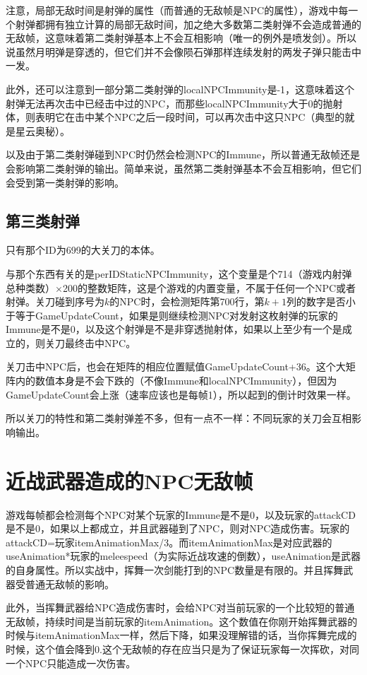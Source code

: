 注意，局部无敌时间是射弹的属性（而普通的无敌帧是NPC的属性），游戏中每一个射弹都拥有独立计算的局部无敌时间，加之绝大多数第二类射弹不会造成普通的无敌帧，这意味着第二类射弹基本上不会互相影响（唯一的例外是喷发剑）。所以说虽然月明弹是穿透的，但它们并不会像陨石弹那样连续发射的两发子弹只能击中一发。

此外，还可以注意到一部分第二类射弹的localNPCImmunity是-1，这意味着这个射弹无法再次击中已经击中过的NPC，而那些localNPCImmunity大于0的抛射体，则表明它在击中某个NPC之后一段时间，可以再次击中这只NPC（典型的就是星云奥秘）。

以及由于第二类射弹碰到NPC时仍然会检测NPC的Immune，所以普通无敌帧还是会影响第二类射弹的输出。简单来说，虽然第二类射弹基本不会互相影响，但它们会受到第一类射弹的影响。

\subsection{第三类射弹}
只有那个ID为699的大关刀的本体。

与那个东西有关的是perIDStaticNPCImmunity，这个变量是个714（游戏内射弹总种类数）$\times$200的整数矩阵，这是个游戏的内置变量，不属于任何一个NPC或者射弹。关刀碰到序号为$k$的NPC时，会检测矩阵第700行，第$k+1$列的数字是否小于等于GameUpdateCount，如果是则继续检测NPC对发射这枚射弹的玩家的Immune是不是0，以及这个射弹是不是非穿透抛射体，如果以上至少有一个是成立的，则关刀最终击中NPC。

关刀击中NPC后，也会在矩阵的相应位置赋值GameUpdateCount+36。这个大矩阵内的数值本身是不会下跌的（不像Immune和localNPCImmunity），但因为GameUpdateCount会上涨（速率应该也是每帧1），所以起到的倒计时效果一样。

所以关刀的特性和第二类射弹差不多，但有一点不一样：不同玩家的关刀会互相影响输出。

\section{近战武器造成的NPC无敌帧}
游戏每帧都会检测每个NPC对某个玩家的Immune是不是0，以及玩家的attackCD是不是0，如果以上都成立，并且武器碰到了NPC，则对NPC造成伤害。玩家的attackCD=玩家itemAnimationMax/3。而itemAnimationMax是对应武器的useAnimation*玩家的meleespeed（为实际近战攻速的倒数），useAnimation是武器的自身属性。所以实战中，挥舞一次剑能打到的NPC数量是有限的。并且挥舞武器受普通无敌帧的影响。

此外，当挥舞武器给NPC造成伤害时，会给NPC对当前玩家的一个比较短的普通无敌帧，持续时间是当前玩家的itemAnimation。这个数值在你刚开始挥舞武器的时候与itemAnimationMax一样，然后下降，如果没理解错的话，当你挥舞完成的时候，这个值会降到0.这个无敌帧的存在应当只是为了保证玩家每一次挥砍，对同一个NPC只能造成一次伤害。


